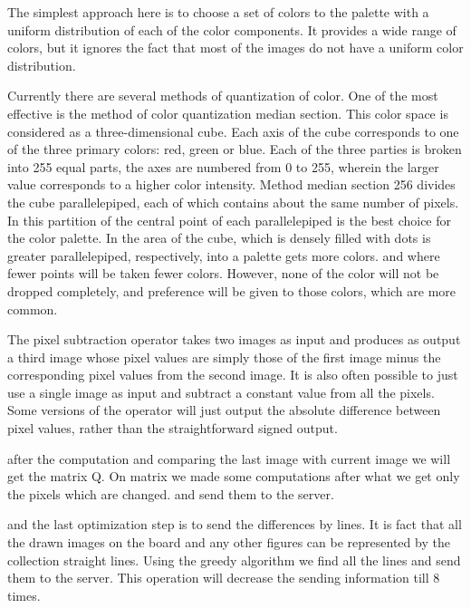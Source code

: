 The simplest approach here is to choose a set of colors to the palette with a uniform distribution of each of the color components. It provides a wide range of colors, but it ignores the fact that most of the images do not have a uniform color distribution.

Currently there are several methods of quantization of color. One of the most effective is the method of color quantization median section. This color space is considered as a three-dimensional cube. Each axis of the cube corresponds to one of the three primary colors: red, green or blue. Each of the three parties is broken into 255 equal parts, the axes are numbered from 0 to 255, wherein the larger value corresponds to a higher color intensity. Method median section 256 divides the cube parallelepiped, each of which contains about the same number of pixels. In this partition of the central point of each parallelepiped is the best choice for the color palette. In the area of the cube, which is densely filled with dots is greater parallelepiped, respectively, into a palette gets more colors. and where fewer points will be taken fewer colors. However, none of the color will not be dropped completely, and preference will be given to those colors, which are more common.

The pixel subtraction operator takes two images as input and produces as output a third image whose pixel values are simply those of the first image minus the corresponding pixel values from the second image. It is also often possible to just use a single image as input and subtract a constant value from all the pixels. Some versions of the operator will just output the absolute difference between pixel values, rather than the straightforward signed output. \cite{Pilet}

after the computation and comparing the last image with current image we will get the matrix Q. On matrix we made some computations after what we get only the pixels which are changed. and send them to the server.

and the last optimization step is to send the differences by lines. It is fact that all the drawn images on the board and any other figures can be represented by the collection straight lines. Using the greedy algorithm we find all the lines and send them to the server. This operation will decrease the sending information till 8 times.


